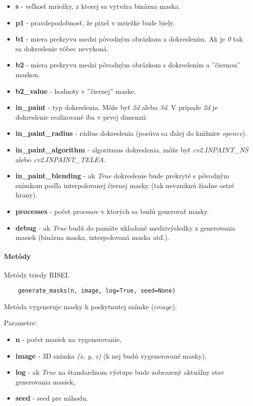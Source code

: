 \begin{itemize}
    \item \textbf{s} - veľkosť mriežky, z ktorej sa vytvára binárna maska.
    \item \textbf{p1} - pravdepodobnosť, že pixel v mriežke bude biely.
    \item \textbf{b1} - miera prekryvu medzi pôvodným obrázkom a dokreslením. Ak je \textit{0} tak sa dokreslenie vôbec nevykoná.
    \item \textbf{b2} - miera prekryvu medzi pôvodným obrázkom s dokreslením a ''čiernou'' maskou. 
    \item \textbf{b2\_value} - hodnoty v ''čiernej'' maske.
    \item \textbf{in\_paint} - typ dokreslenia. Môže byť \textit{2d} alebo \textit{3d}. V prípade \textit{2d} je dokreslenie realizované iba v prvej dimenzii.
    \item \textbf{in\_paint\_radius} - rádius dokreslenia (posúva sa ďalej do knižnice \textit{opencv}).
    \item \textbf{in\_paint\_algorithm} - algoritmus dokreslenia, môže byť \textit{cv2.INPAINT\_NS} alebo \textit{cv2.INPAINT\_TELEA}.
    \item \textbf{in\_paint\_blending} - ak \textit{True} dokreslenie bude prekryté s pôvodným snímkom podľa interpolovanej čiernej masky (tak nevzniknú žiadne ostré hrany).
    \item \textbf{processes} - počet procesov v ktorých sa budú generovať masky.
    \item \textbf{debug} - ak \textit{True} budú do pamäte ukladané medzivýsledky z generovania masiek (binárna maska, interpolovaná maska atď.).
\end{itemize}

\paragraph{Metódy}

Metódy triedy RISEI.

\vspace{8pt}
\begin{lstlisting}
    generate_masks(n, image, log=True, seed=None)
\end{lstlisting}

Metóda vygeneruje masky k poskytnutej snímke ($image$).

Parametre:
\begin{itemize}
    \item \textbf{n} - počet masiek na vygenerovanie,
    \item \textbf{image} - 3D snímka \textit{(x, y, z)} (k nej budú vygenerované masky),
    \item \textbf{log} - ak \textit{True} na štandardnom výstupe bude zobrazený aktuálny stav generovania masiek,
    \item \textbf{seed} - seed pre náhodu.
\end{itemize}

